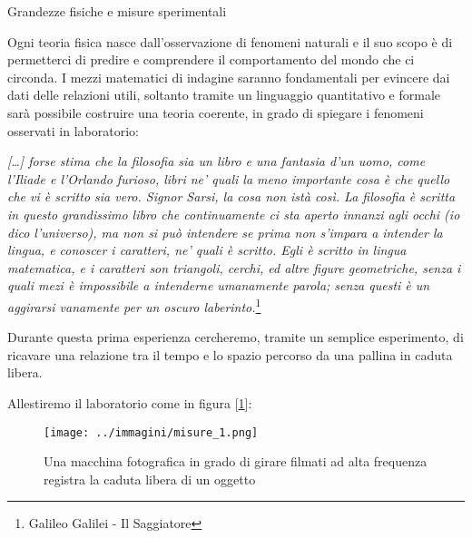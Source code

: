 \documentclass[a4paper,10pt,oneside]{article}
\begin{document}
{\huge Grandezze fisiche e misure sperimentali}
\begin{abstract}
La fisica (dal greco \textgreek{φύσις} natura) è una scienza naturale il cui scopo è l'analisi della natura e quindi dell'universo che ci circonda, in ognuno dei suoi aspetti. Lo strumento da essa utilizzato per la conoscenza del mondo è il metodo sperimentale e le grandezze di cui essa si occupa vengono manipolate in maniera quantitativa tramite la matematica.
\end{abstract}

\vspace{0.5cm}

Ogni teoria fisica nasce dall'osservazione di fenomeni naturali e il suo scopo è di permetterci di predire e comprendere il comportamento del mondo che ci circonda. 
I mezzi matematici di indagine saranno fondamentali per evincere dai dati delle relazioni utili, soltanto tramite un linguaggio quantitativo e formale sarà possibile costruire una teoria coerente, in grado di spiegare i fenomeni osservati in laboratorio: 

\emph{[\ldots] forse stima che la filosofia sia un libro e una fantasia d'un uomo, come l'Iliade e l'Orlando furioso, libri ne' quali la meno importante cosa è che quello che vi è scritto sia vero. Signor Sarsi, la cosa non istà così. La filosofia è scritta in questo grandissimo libro che continuamente ci sta aperto innanzi agli occhi (io dico l’universo), ma non si può intendere se prima non s'impara a intender la lingua, e conoscer i caratteri, ne' quali è scritto. Egli è scritto in lingua matematica, e i caratteri son triangoli, cerchi, ed altre figure geometriche, senza i quali mezi è impossibile a intenderne umanamente parola; senza questi è un aggirarsi vanamente per un oscuro laberinto.}\footnote{Galileo Galilei - Il Saggiatore}

\vspace{0.5cm}

Durante questa prima esperienza  cercheremo, tramite un semplice esperimento, di ricavare una relazione tra il tempo e lo spazio percorso da una pallina in caduta libera.

Allestiremo il laboratorio come in figura [\ref{fig:setup_sperimentale}]:
\begin{figure}[H]
 \centering
 \texttt{[image: ../immagini/misure\_1.png]}
 \caption{Una macchina fotografica in grado di girare filmati ad alta frequenza registra la caduta libera di un oggetto}
 \label{fig:setup_sperimentale}
\end{figure}
\end{document}
